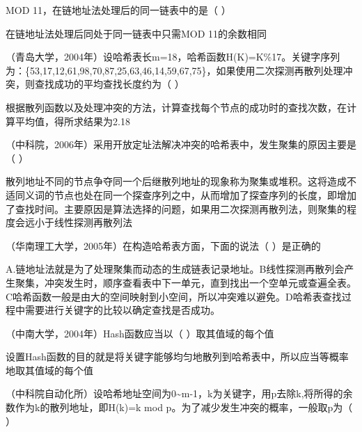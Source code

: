MOD 11，在链地址法处理后的同一链表中的是（ ）
\par{}
\begin{solution}在链地址法处理后同处于同一链表中只需MOD 11的余数相同
\end{solution}
\question （青岛大学，2004年）设哈希表长m=18，哈希函数H(K)=K\%17。关键字序列为：\{53,17,12,61,98,70,87,25,63,46,14,59,67,75\}，如果使用二次探测再散列处理冲突，则查找成功的平均查找长度约为（
）
\par{}
\begin{solution}根据散列函数以及处理冲突的方法，计算查找每个节点的成功时的查找次数，在计算平均值，得所求结果为2.18
\end{solution}
\question （中科院，2006年）采用开放定址法解决冲突的哈希表中，发生聚集的原因主要是（
）
\par{}
\begin{solution}散列地址不同的节点争夺同一个后继散列地址的现象称为聚集或堆积。这将造成不适同义词的节点也处在同一个探查序列之中，从而增加了探查序列的长度，即增加了查找时间。主要原因是算法选择的问题，如果用二次探测再散列法，则聚集的程度会远小于线性探测再散列法
\end{solution}
\question （华南理工大学，2005年）在构造哈希表方面，下面的说法（ ）是正确的
\par{}
\begin{solution}A.链地址法就是为了处理聚集而动态的生成链表记录地址。B线性探测再散列会产生聚集，冲突发生时，顺序查看表中下一单元，直到找出一个空单元或查遍全表。C哈希函数一般是由大的空间映射到小空间，所以冲突难以避免。D哈希表查找过程中需要进行关键字的比较以确定查找是否成功。
\end{solution}
\question （中南大学，2004年）Hash函数应当以（ ）取其值域的每个值
\par{}
\begin{solution}设置Hash函数的目的就是将关键字能够均匀地散列到哈希表中，所以应当等概率地取其值域的每个值
\end{solution}
\question （中科院自动化所）设哈希地址空间为0\textasciitilde{}m-1，k为关键字，用p去除k,将所得的余数作为k的散列地址，即H(k)=k
mod p。为了减少发生冲突的概率，一般取p为（ ）
\par{}
